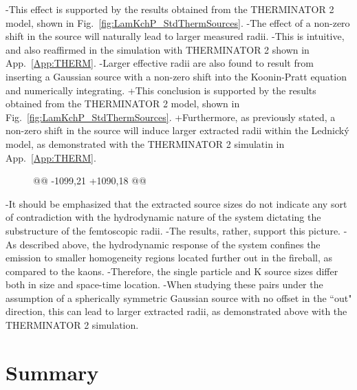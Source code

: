 -This effect is supported by the results obtained from the THERMINATOR 2 model, shown in Fig.\ \ref{fig:LamKchP_StdThermSources}.
-The effect of a non-zero shift in the source will naturally lead to larger measured radii.
-This is intuitive, and also reaffirmed in the simulation with THERMINATOR 2 shown in App.\ \ref{App:THERM}.
-Larger effective radii are also found to result from inserting a Gaussian source with a non-zero shift into the Koonin-Pratt equation and numerically integrating.
+This conclusion is supported by the results obtained from the THERMINATOR 2 model, shown in Fig.\ \ref{fig:LamKchP_StdThermSources}.
+Furthermore, as previously stated, a non-zero shift in the source will induce larger extracted radii within the Lednick\'y model, as demonstrated with the THERMINATOR 2 simulatin in App.\ \ref{App:THERM}.
 
 \begin{figure}[h!]
   \centering
@@ -1099,21 +1090,18 @@
   \label{fig:LamKchP_ReC00C11_0010}
 \end{figure}
 
-It should be emphasized that the extracted \LamK source sizes do not indicate any sort of contradiction with the hydrodynamic nature of the system dictating the substructure of the femtoscopic radii.
-The results, rather, support this picture.
-As described above, the hydrodynamic response of the system confines the \Lam emission to smaller homogeneity regions located further out in the fireball, as compared to the kaons.
-Therefore, the single particle \Lam and K source sizes differ both in size and space-time location.
-When studying these pairs under the assumption of a spherically symmetric Gaussian source with no offset in the ``out" direction, this can lead to larger extracted radii, as demonstrated above with the THERMINATOR 2 simulation.
 
 \section{Summary}
 \label{sec:Summary}
 
